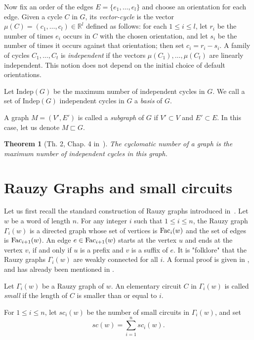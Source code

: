 \documentclass[runningheads,envcountsame,a4paper]{llncs}
\newtheorem{thm}{Theorem}
\newcommand{\fac}{\hbox{\rm Fac}}
\newcommand{\indep}{\mathrm{Indep}}
\begin{document}
Now fix an order of the edges $E=\{e_1,\ldots,e_l\}$ and choose an orientation for each edge. Given a cycle $C$ in $G$, its \emph{vector-cycle} is the vector $\mu(C)=(c_1,\ldots,c_l)\in\mathbb{R}^l$ defined as follows:
for each $1\le i\le l$, let $r_i$ be the number of times $e_i$ occurs in $C$ with the chosen orientation, and let $s_i$ be the number of times it occurs against that orientation; then set $c_i=r_i-s_i$.
A family of cycles $C_1,\ldots,C_t$ is \emph{independent} if the vectors $\mu(C_1),\ldots,\mu(C_t)$ are linearly independent.
This notion does not depend on the initial choice of default orientations.

Let $\indep(G)$ be the maximum number of independent cycles in $G$. We call a set of $\indep(G)$ independent cycles in $G$ a \emph{basis} of $G$. 

A graph $M=(V', E')$ is called a \emph{subgraph} of $G$ if $V' \subset V$ and $E' \subset E$. In this case, let us denote $M \sqsubset G$.

\begin{thm}[{\rm Th. 2, Chap. 4 in~\cite{berge}}]
\label{book}
The cyclomatic number of a graph is the maximum number of independent cycles in this graph.
\end{thm}


\section{Rauzy Graphs and small circuits}\label{sec3}

Let us first recall the standard construction of Rauzy graphs introduced in~\cite{Rauzy}. Let $w$ be a word of length $n$. For any integer $i$ such that $1\leq i\leq n$, the Rauzy graph $\Gamma_i(w)$ is a directed graph whose set of vertices is $\fac_i(w)$ and the set of edges is $\fac_{i+1}(w)$.
An edge $e \in \fac_{i+1}(w)$ starts at the vertex $u$ and ends at the vertex $v$, if and only if $u$ is a prefix and $v$ is a suffix of $e$. It is "folklore" that the Rauzy graphs $\Gamma_i(w)$ are weakly connected for all $i$. A formal proof is given in \cite{aclss25}, and has already been mentioned in \cite{rote94}.


Let $\Gamma_i(w)$ be a Rauzy graph of $w$. An elementary circuit $C$ in $\Gamma_i(w)$ is called {\em small} if the length of $C$ is smaller than or equal to $i$.

For $1\le i\le n$, let $sc_i(w)$ be the number of small circuits in $\Gamma_i(w)$, and set
\[
sc(w)=\sum_{i=1}^n sc_i(w).
\]
\end{document}
